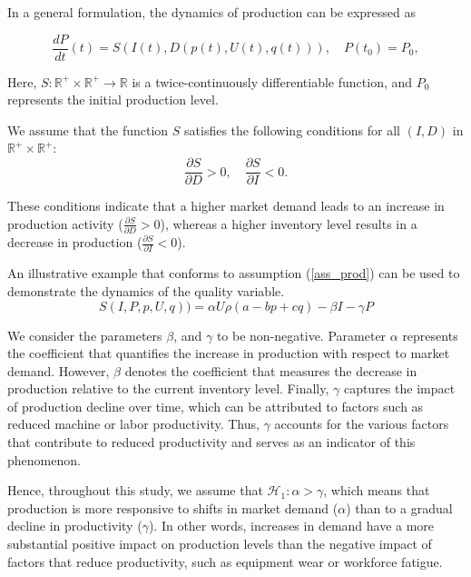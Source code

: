 \documentclass[]{interact}
\theoremstyle{plain}%
\theoremstyle{definition}
\theoremstyle{remark}
\begin{document}
In a general formulation, the dynamics of production can be expressed as

\begin{equation}\label{prod}
	\frac{dP}{dt}(t) = S(I(t), D(p(t),U(t),q(t))), \quad P(t_0) = P_{0},
\end{equation}

Here, $S: \mathbb{R}^{+} \times \mathbb{R}^{+} \rightarrow \mathbb{R}$ is a twice-continuously differentiable function, and $P_0$ represents the initial production level.

We assume that the function $S$ satisfies the following conditions for all $(I, D)$ in $\mathbb{R}^{+} \times \mathbb{R}^{+}$:
\begin{equation}\label{ass_prod}
	\frac{\partial S}{\partial D}>0, \quad \frac{\partial S}{\partial I}<0.
\end{equation}

These conditions indicate that a higher market demand leads to an increase in production activity ($\frac{\partial S}{\partial D}>0$), whereas a higher inventory level results in a decrease in production ($\frac{\partial S}{\partial I}<0$).

An illustrative example that conforms to assumption (\ref{ass_prod}) can be used to demonstrate the dynamics of the quality variable.
\[S(I,P,p,U,q)) = \alpha U \rho(a-b p+c q) - \beta I - \gamma P\]

We consider the parameters \(\beta\), and \(\gamma\) to be non-negative. Parameter \(\alpha\) represents the coefficient that quantifies the increase in production with respect to market demand. However, \(\beta\) denotes the coefficient that measures the decrease in production relative to the current inventory level. Finally, \(\gamma\) captures the impact of production decline over time, which can be attributed to factors such as reduced machine or labor productivity. Thus, \(\gamma\) accounts for the various factors that contribute to reduced productivity and serves as an indicator of this phenomenon.

Hence, throughout this study, we assume that \( \mathcal{H}_{1}: \alpha > \gamma \), which means that production is more responsive to shifts in market demand (\(\alpha\)) than to a gradual decline in productivity (\(\gamma\)). In other words, increases in demand have a more substantial positive impact on production levels than the negative impact of factors that reduce productivity, such as equipment wear or workforce fatigue.
\end{document}
